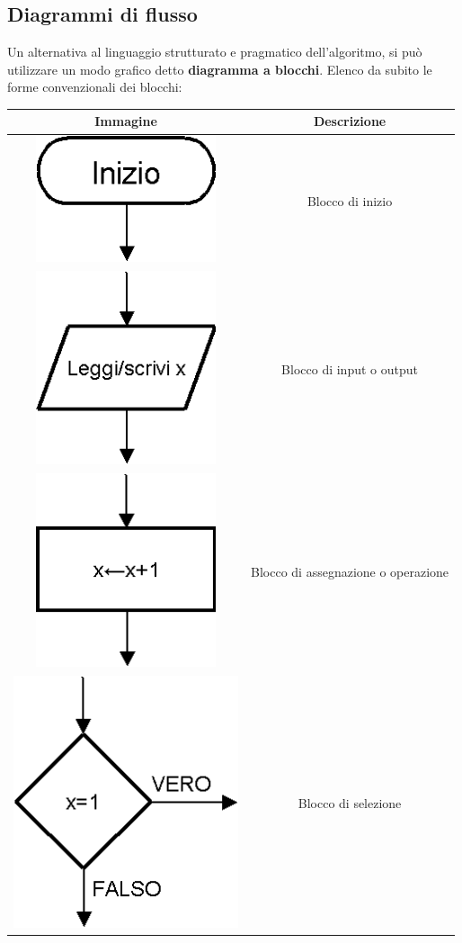 \documentclass{article}
\begin{document}
	\subsection{Diagrammi di flusso}
	Un alternativa al linguaggio strutturato e pragmatico dell'algoritmo, si può utilizzare un modo grafico detto \textbf{diagramma a blocchi}. Elenco da subito le forme convenzionali dei blocchi:\\
	\begin{center}
		\begin{tabular}{c|c}
			\hline
			Immagine & Descrizione \\
			\hline
			\includegraphics[scale=0.5]{Inizio.png} & Blocco di inizio \\
			\hline
			\includegraphics[scale=0.5]{Input.png} & Blocco di input o output \\
			\hline
			\includegraphics[scale=0.5]{Azione.png} & Blocco di assegnazione o operazione \\
			\hline
			\includegraphics[scale=0.5]{Controllo.png} & Blocco di selezione \\

\end{tabular}
\end{center}
\end{document}
